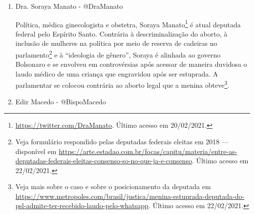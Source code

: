 \documentclass[
	12pt,				%
	openright,			%
	twoside,			%
	a4paper,			%
	english,			%
	brazil				%
	]{abntex2}
\begin{document}
\begin{anexosenv}
\begin{enumerate}
 \begin{figure}[!htbp]
    \centering
    \texttt{[image: dg\_1.png]}
    \caption{Postagem no Twitter de Douglas Garcia. Disponível em \url{https://twitter.com/DouglasGarcia/status/1103989634990772224}. Último acesso em 22/02/2021.}
 \end{figure}
 
 \begin{figure}[!htbp]
    \centering
    \texttt{[image: so\_1.png]}
    \caption{Postagem no \textit{instagram} de Dra. Soraya Manato. Disponível em \url{https://www.instagram.com/tv/CHJi6rODUQp/}. Último acesso em 22/02/2021.}
 \end{figure}
 
 \item Dra. Soraya Manato - @DraManato
 
 Política, médica ginecologista e obstetra, Soraya Manato\footnote{\url{https://twitter.com/DraManato}. Último acesso em 20/02/2021.} é atual deputada federal pelo Espírito Santo. Contrária à descriminalização do aborto, à inclusão de mulheres na política por meio de reserva de cadeiras no parlamento\footnote{Veja formulário respondido pelas deputadas federais eleitas em 2018 --- disponível em \url{https://arte.estadao.com.br/focas/capitu/materia/entre-as-deputadas-federais-eleitas-consenso-so-no-que-ja-e-consenso}. Último acesso em 22/02/2021.} e à ``ideologia de gênero'', Soraya é alinhada ao governo Bolsonaro e se envolveu em controvérsias após acessar de maneira duvidosa o laudo médico de uma criança que engravidou após ser estuprada. A parlamentar se colocou contrária ao aborto legal que a menina obteve\footnote{Veja mais sobre o caso e sobre o posicionamento da deputada em \url{https://www.metropoles.com/brasil/justica/menina-estuprada-deputada-do-psl-admite-ter-recebido-laudo-pelo-whatsapp}. Último acesso em 22/02/2021.}.
 
 \item Edir Macedo - @BispoMacedo\label{macedo}
 

\end{enumerate}
\end{anexosenv}
\end{document}
